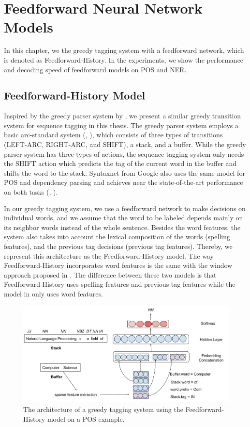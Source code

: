 
\chapter{Feedforward Neural Network Models}

In this chapter, we the greedy tagging system with a feedforward network, which is denoted as Feedforward-History. In the experiments, we show the performance and decoding speed of feedforward models on POS and NER. 

\section{Feedforward-History Model}

Inspired by the greedy parser system by \cite{chen2014fast}, we present a similar greedy transition system for sequence tagging in this thesis. The greedy parser system employs a basic arc-standard system (\citeauthor{nivre2004deterministic}, \citeyear{nivre2004deterministic}), which consists of three types of transitions (LEFT-ARC, RIGHT-ARC, and SHIFT), a stack, and a buffer. While the greedy parser system has three types of actions, the sequence tagging system only needs the SHIFT action which predicts the tag of the current word in the buffer and shifts the word to the stack.  Syntaxnet from Google also uses the same model for POS and dependency parsing and achieves near the state-of-the-art performance on both tasks (\citeauthor{alberti2017syntaxnet}, \citeyear{alberti2017syntaxnet}).

In our greedy tagging system, we use a feedforward network to make decisions on individual words, and we assume that the word to be labeled depends mainly on its neighbor words instead of the whole sentence. Besides the word features, the system also takes into account the lexical composition of the words (spelling features), and the previous tag decisions (previous tag features). Thereby, we represent this architecture as the Feedforward-History model. The way Feedforward-History incorporates word features is the same with the window approach proposed in \cite{collobert2011natural}. The difference between these two models is that Feedforward-History uses spelling features and previous tag features while the model in \cite{collobert2011natural} only uses word features.

\begin{figure}[h]
  \centering
  \includegraphics[width=1.0\linewidth]{greedypos.pdf}
 \caption{The architecture of a greedy tagging system using the Feedforward-History model on a POS example.}
  \label{fig:greedypos}
\end{figure}

